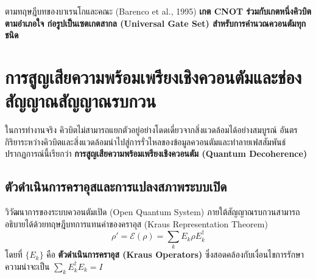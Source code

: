 ตามทฤษฎีบทของบาเรนโกและคณะ (Barenco et al., 1995) \textbf{เกต CNOT ร่วมกับเกตหนึ่งคิวบิตตามอำเภอใจ ก่อรูปเป็นเซตเกตสากล (Universal Gate Set) สำหรับการคำนวณควอนตัมทุกชนิด}

\section{การสูญเสียความพร้อมเพรียงเชิงควอนตัมและช่องสัญญาณสัญญาณรบกวน}

ในการทำงานจริง คิวบิตไม่สามารถแยกตัวอยู่อย่างโดดเดี่ยวจากสิ่งแวดล้อมได้อย่างสมบูรณ์ อันตรกิริยาระหว่างคิวบิตและสิ่งแวดล้อมนำไปสู่การรั่วไหลของข้อมูลควอนตัมและทำลายเฟสสัมพันธ์ ปรากฏการณ์นี้เรียกว่า \textbf{การสูญเสียความพร้อมเพรียงเชิงควอนตัม (Quantum Decoherence)}

\subsection{ตัวดำเนินการคราอุสและการแปลงสภาพระบบเปิด}
วิวัฒนาการของระบบควอนตัมเปิด (Open Quantum System) ภายใต้สัญญาณรบกวนสามารถอธิบายได้ด้วยทฤษฎีบทการแทนค่าของคราอุส (Kraus Representation Theorem)
\begin{equation}
\rho' = \mathcal{E}(\rho) = \sum_k E_k \rho E_k^\dagger
\label{eq:kraus_representation}
\end{equation}
โดยที่ $\{ E_k \}$ คือ \textbf{ตัวดำเนินการคราอุส (Kraus Operators)} ซึ่งสอดคล้องกับเงื่อนไขการรักษาความน่าจะเป็น $\sum_k E_k^\dagger E_k = I$

